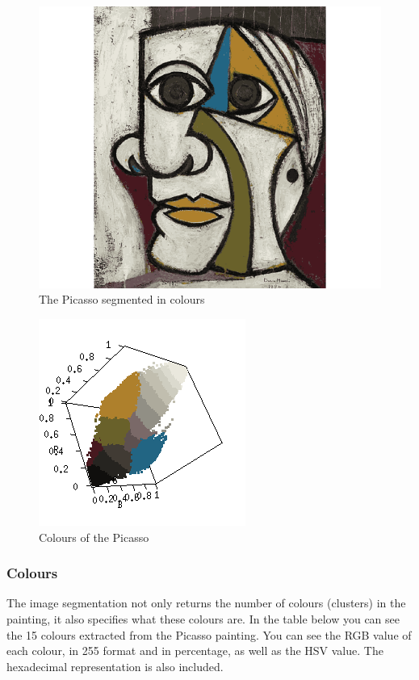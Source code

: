 \documentclass[12pt]{article}
\begin{document}
\begin{figure}[h]
\hspace*{-0.70cm}
\centering
\includegraphics[scale = 0.6]{img/picasso_segmented}
\caption{The Picasso segmented in colours}
\label{picasso_segmented}
\end{figure} 

\begin{figure}[h]
\centering
\includegraphics[scale = 1]{img/picasso_colors}
\caption{Colours of the Picasso}
\label{picasso_colors}
\end{figure}

\subsubsection{Colours}

The image segmentation not only returns the number of colours (clusters) in the painting, it also specifies what these colours are. In the table below you can see the 15 colours extracted from the Picasso painting. You can see the RGB value of each colour, in 255 format and in percentage, as well as the HSV value. The hexadecimal representation is also included.
\end{document}
